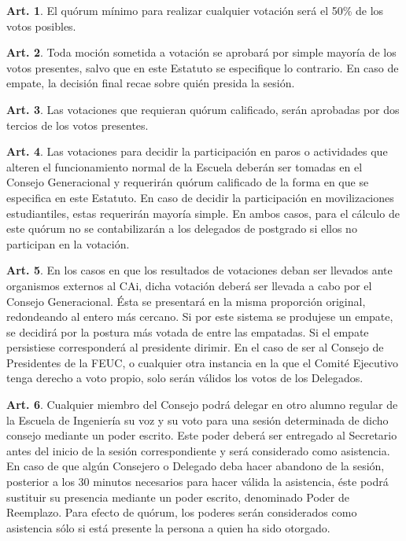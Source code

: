 \documentclass[letterpaper,11pt]{article}
\theoremstyle{definition}%
\newtheorem{art}{Art.} %
\begin{document}
\begin{art}\label{quorumMinimoVotacion}
	El quórum mínimo para realizar cualquier votación será el 50\% de los votos posibles.
\end{art}

\begin{art}\label{esquemaVotacion}
	Toda moción sometida a votación se aprobará por simple mayoría de los votos presentes, salvo que en este Estatuto se especifique lo contrario. En caso de empate, la decisión final recae sobre quién presida la sesión.
\end{art}

\begin{art}\label{quorumCalificado}
	Las votaciones que requieran quórum calificado, serán aprobadas por dos tercios de los votos presentes.
\end{art}

\begin{art}\label{votacionMovilizacionParo}
	Las votaciones para decidir la participación en paros o actividades que alteren el funcionamiento normal de la Escuela deberán ser tomadas en el Consejo Generacional y requerirán quórum calificado de la forma en que se especifica en este Estatuto. En caso de decidir la participación en movilizaciones estudiantiles, estas requerirán mayoría simple. En ambos casos, para el cálculo de este quórum no se contabilizarán a los delegados de postgrado si ellos no participan en la votación.
\end{art}

\begin{art}\label{votacionExterna}
	En los casos en que los resultados de votaciones deban ser llevados ante organismos externos al CAi, dicha votación deberá ser llevada a cabo por el Consejo Generacional. Ésta se presentará en la misma proporción original, redondeando al entero más cercano. Si por este sistema se produjese un empate, se decidirá por la postura más votada de entre las empatadas. Si el empate persistiese corresponderá al presidente dirimir. En el caso de ser al Consejo de Presidentes de la FEUC, o cualquier otra instancia en la que el Comité Ejecutivo tenga derecho a voto propio, solo serán válidos los votos de los Delegados.
\end{art}

\begin{art}\label{definicionPoder}
	Cualquier miembro del Consejo podrá delegar en otro alumno regular de la Escuela de Ingeniería su voz y su voto para una sesión determinada de dicho consejo mediante un poder escrito. Este poder deberá ser entregado al Secretario antes del inicio de la sesión correspondiente y será considerado como asistencia. En caso de que algún Consejero o Delegado deba hacer abandono de la sesión, posterior a los 30 minutos necesarios para hacer válida la asistencia, éste podrá sustituir su presencia mediante un poder escrito, denominado Poder de Reemplazo. Para efecto de quórum, los poderes serán considerados como asistencia sólo si está presente la persona a quien ha sido otorgado.
\end{art}
\end{document}
